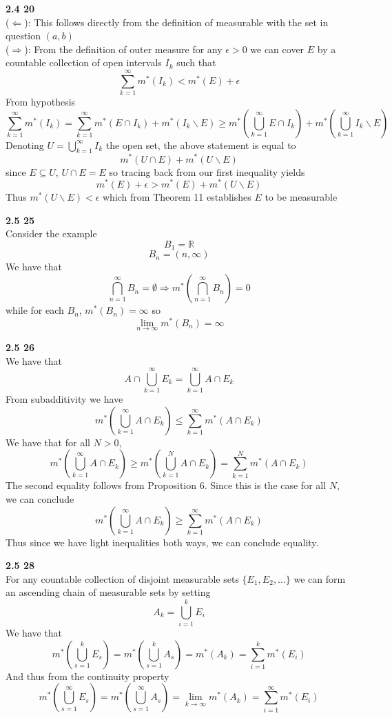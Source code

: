 \documentclass[12pt]{article}
\newenvironment{ques}[1]{\textbf{#1}\vspace{1 mm}\\ }{\bigskip}
\theoremstyle{definition}
\renewcommand{\l}{\left }
\renewcommand{\r}{\right }
\newcommand{\R}{\mathbb R}
\renewcommand{\-}{\backslash}
\begin{document}
\begin{ques}{2.4 20}
	($\Leftarrow$): This follows directly from the definition of measurable
	with the set in question $(a,b)$\\
	($\Rightarrow$): From the definition of outer measure for any $\epsilon >
	0$ we can cover $E$ by a countable collection of open intervals $I_k$ such that
	$$\sum_{k=1}^\infty m^*(I_k) < m^*(E) + \epsilon$$
	From hypothesis
	$$\sum_{k=1}^\infty m^*(I_k) = \sum_{k=1}^\infty m^*(E \cap I_k) + m^*(I_k
	\backslash E) \geq m^*\l(\bigcup_{k=1}^\infty E \cap I_k \r) +
	m^*\l(\bigcup_{k=1}^\infty I_k \backslash E \r)$$
	Denoting $U = \bigcup_{k=1}^\infty I_k$ the open set, the above statement
	is equal to 
	$$m^*(U \cap E) + m^*(U \backslash E)$$
	since $E \subseteq U$, $U \cap E = E$ so tracing back from our first
	inequality yields
	$$m^*(E) + \epsilon > m^*(E) + m^*(U \backslash E)$$
	Thus $m^*(U \backslash E) < \epsilon$ which from Theorem 11 establishes $E$
	to be measurable
\end{ques}

\begin{ques}{2.5 25}
	Consider the example 
	$$B_1 = \R$$
	$$B_n = (n, \infty)$$
	We have that
	$$\bigcap_{n=1}^\infty B_n = \emptyset \Rightarrow
	m^*\l(\bigcap_{n=1}^\infty B_n\r) = 0$$
	while for each $B_n$, $m^*(B_n) = \infty$ so
	$$\lim_{n \to \infty} m^*(B_n) = \infty$$
\end{ques}

\begin{ques}{2.5 26}
	We have that 
	$$A \cap  \bigcup_{k=1}^\infty E_k = \bigcup_{k=1}^\infty A \cap E_k$$
	From subadditivity we have
	$$m^*\l(\bigcup_{k=1}^\infty A \cap E_k\r) \leq \sum_{k=1}^\infty m^*(A
	\cap E_k)$$
	We have that for all $N > 0$,
	$$m^*\l(\bigcup_{k=1}^\infty A \cap E_k\r) \geq m^*\l(\bigcup_{k=1}^N A
	\cap E_k \r) = \sum_{k=1}^N m^*(A \cap E_k)$$
	The second equality follows from Proposition 6. Since this is the case for
	all $N$, we can conclude
	$$m^*\l(\bigcup_{k=1}^\infty A \cap E_k\r) \geq \sum_{k=1}^\infty m^*(A
	\cap E_k)$$
	Thus since we have light inequalities both ways, we can conclude equality.\\
\end{ques}

\begin{ques}{2.5 28}
	For any countable collection of disjoint measurable sets $\{E_1, E_2, \dots\}$ 
	we can form an ascending chain of measurable sets by setting 
	$$A_k = \bigcup_{i=1}^k E_i$$
	We have that
	$$m^*\l(\bigcup_{s =1}^k E_s\r) = m^*\l(\bigcup_{s =1}^k A_s\r) = m^*(A_k)
	= \sum_{i=1}^k m^*(E_i)$$
	And thus from the continuity property
	$$m^*\l(\bigcup_{s =1}^\infty E_s\r) = m^*\l(\bigcup_{s =1}^\infty A_s\r) =
	\lim_{k \to \infty} m^*(A_k) = \sum_{i=1}^\infty m^*(E_i)$$
\end{ques}
\end{document}
